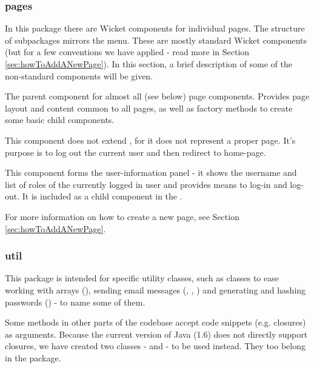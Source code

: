 \subsubsection{pages}

In this package there are Wicket components for individual pages. The structure of subpackages mirrors the \FE menu. These are mostly standard Wicket components (but for a few conventions we have applied - read more in Section \ref{sec:howToAddANewPage}). In this section, a brief description of some of the non-standard components will be given.

\begin{description}[style=nextline,font=\ttfamily]
	\item[FrontendPage] The parent component for almost all (see below) page components. Provides page layout and content common to all pages, as well as factory methods to create some basic child components.
	\item[LogoutPage] This component does not extend , for it does not represent a proper page. It's purpose is to log out the current user and then redirect to home-page.
	\item[UserPanel] This component forms the user-information panel - it shows the username and list of roles of the currently logged in user and provides means to log-in and log-out. It is included as a child component in the .
\end{description}
	
For more information on how to create a new page, see Section \ref{sec:howToAddANewPage}.

\subsubsection{util}

This package is intended for \FE specific utility classes, such as classes to ease working with arrays (), sending email messages (, , ) and generating and hashing passwords () - to name some of them.

Some methods in other parts of the \FE codebase accept code snippets (e.g. closures) as arguments. Because the current version of Java (1.6) does not directly support closures, we have created two classes -  and  - to be used instead. They too belong in the  package.

